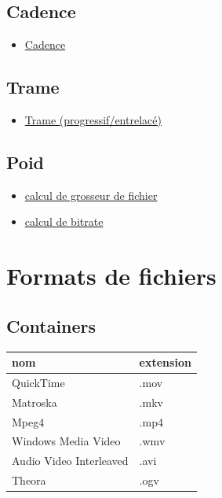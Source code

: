 \documentclass[
]{book}
\providecommand{\tightlist}{%
  \setlength{\itemsep}{0pt}\setlength{\parskip}{0pt}}
\begin{document}
\hypertarget{cadence}{%
\subsection{Cadence}\label{cadence}}

\begin{itemize}
\tightlist
\item
  \href{https://frames-per-second.appspot.com}{Cadence}
\end{itemize}

\hypertarget{trame}{%
\subsection{Trame}\label{trame}}

\begin{itemize}
\tightlist
\item
  \href{https://web.archive.org/web/20140222010640/http://neuron2.net/LVG/interlacing.html}{Trame (progressif/entrelacé)}
\end{itemize}

\hypertarget{poid}{%
\subsection{Poid}\label{poid}}

\begin{itemize}
\tightlist
\item
  \href{https://toolstud.io/video/filesize.php?imagewidth=1920\&imageheight=1080\&framerate=29.97\&timeduration=60\&timeunit=seconds}{calcul de grosseur de fichier}
\item
  \href{https://toolstud.io/video/bitrate.php?imagewidth=1\&imageheight=1\&colordepth=24\&framerate=29.97}{calcul de bitrate}
\end{itemize}

\hypertarget{lexique_fichiers}{%
\section{Formats de fichiers}\label{lexique_fichiers}}

\hypertarget{containers}{%
\subsection{Containers}\label{containers}}

\begin{longtable}[]{@{}ll@{}}
\toprule
nom & extension\tabularnewline
\midrule
\endhead
QuickTime & .mov\tabularnewline
Matroska & .mkv\tabularnewline
Mpeg4 & .mp4\tabularnewline
Windows Media Video & .wmv\tabularnewline
Audio Video Interleaved & .avi\tabularnewline
Theora & .ogv\tabularnewline
\bottomrule
\end{longtable}
\end{document}
